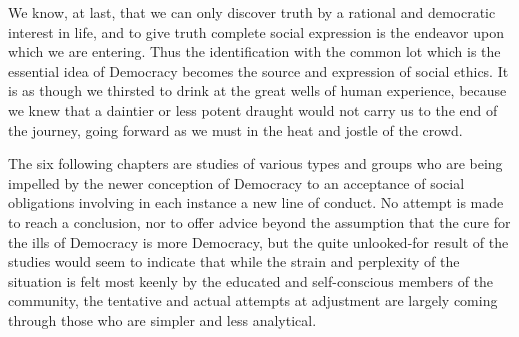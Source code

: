 We know, at last, that we can only discover truth by a rational and
democratic interest in life, and to give truth complete social
expression is the endeavor upon which we are entering. Thus the
identification with the common lot which is the essential idea of
Democracy becomes the source and expression of social ethics. It is as
though we thirsted to drink at the great wells of human experience,
because we knew that a daintier or less potent draught would not carry
us to the end of the journey, going forward as we must in the heat and
jostle of the crowd.

The six following chapters are studies of various types and groups who
are being impelled by the newer conception of Democracy to an
acceptance of social obligations involving in each instance a new line
of conduct. No attempt is made to reach a conclusion, nor to offer
advice beyond the assumption that the cure for the ills of 
Democracy is more Democracy, but the quite unlooked-for result of the
studies would seem to indicate that while the strain and perplexity of
the situation is felt most keenly by the educated and self-conscious
members of the community, the tentative and actual attempts at
adjustment are largely coming through those who are simpler and less
analytical.

